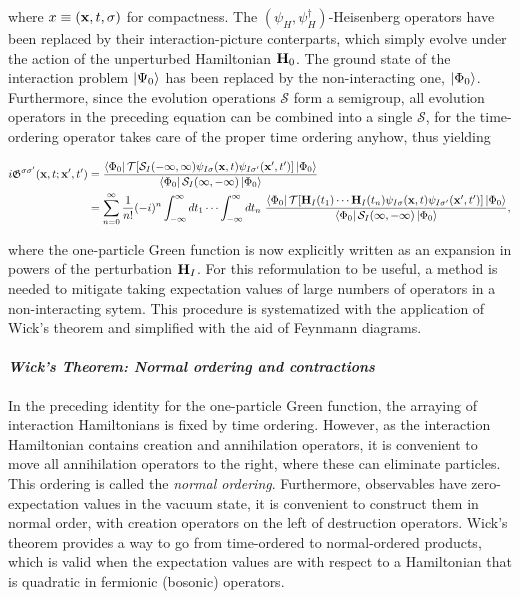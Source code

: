 where $x \equiv ({\bf x}, t, \sigma)$ for compactness. The $(\psi_H, \psi_H^\dagger)$-Heisenberg operators have been replaced by their interaction-picture conterparts, which simply evolve under the action of the unperturbed Hamiltonian ${\bf H}_0$. The ground state of the interaction problem $\ket{\Psi_0}$ has been replaced by the non-interacting one, $\ket{\Phi_0}$. Furthermore, since the evolution operations $\mathcal{S}$ form a semigroup, all evolution operators in the preceding equation can be combined into a single $\mathcal{S}$, for the time-ordering operator takes care of the proper time ordering anyhow, thus yielding 

\begin{equation}
\begin{split}
     i \mathfrak{G}^{\sigma \sigma'}({\bf x}, t; {\bf x}', t') &= \frac{\bra{\Phi_0}  \mathcal{T} [\mathcal{S}_I(-\infty, \infty) \psi_{I \sigma}({\bf x}, t)\psi_{I \sigma'}({\bf x}', t')]\ket{\Phi_0}}{\bra{\Phi_0} \mathcal{S}_I(\infty, -\infty)\ket{\Phi_0}} \\
     &= \sum_{n=0}^{\infty} \frac{1}{n!} (-i)^n \int_{-\infty}^{\infty} dt_1 \cdots \int_{-\infty}^{\infty} dt_n \textnormal{ } \frac{\bra{\Phi_0} \mathcal{T} [{\bf H}_{I}(t_1) \cdots {\bf H}_{I}(t_n) \psi_{I \sigma}({\bf x}, t)\psi_{I \sigma'}({\bf x}', t')]\ket{\Phi_0}}{\bra{\Phi_0} \mathcal{S}_I(\infty, -\infty)\ket{\Phi_0}},
     \label{GF_perturbation_exp}
\end{split}
\end{equation}

where the one-particle Green function is now explicitly written as an expansion in powers of the perturbation ${\bf H}_I$. For this reformulation to be useful, a method is needed to mitigate taking expectation values of large numbers of operators in a non-interacting sytem. This procedure is systematized with the application of Wick's theorem and simplified with the aid of Feynmann diagrams. \\

\paragraph{\textit{Wick's Theorem: Normal ordering and contractions}}

In the preceding identity for the one-particle Green function, the arraying of interaction Hamiltonians is fixed by time ordering. However, as the interaction Hamiltonian contains creation and annihilation operators, it is convenient to move all annihilation operators to the right, where these can eliminate particles. This ordering is called the \textit{normal ordering}. Furthermore, observables have zero-expectation values in the vacuum state, it is convenient to construct them in normal order, with creation operators on the left of destruction operators. Wick's theorem provides a way to go from time-ordered to normal-ordered products, which is valid when the expectation values are with respect to a Hamiltonian that is quadratic in fermionic (bosonic) operators. \\

